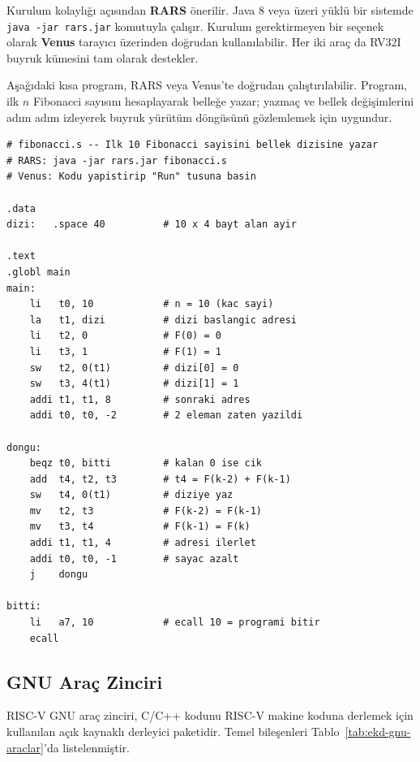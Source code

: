 \begin{bilginot}
Kurulum kolaylığı açısından \textbf{RARS} önerilir. Java 8 veya üzeri yüklü bir sistemde \texttt{java -jar rars.jar} komutuyla çalışır. Kurulum gerektirmeyen bir seçenek olarak \textbf{Venus} tarayıcı üzerinden doğrudan kullanılabilir. Her iki araç da RV32I buyruk kümesini tam olarak destekler.
\end{bilginot}

Aşağıdaki kısa program, RARS veya Venus'te doğrudan çalıştırılabilir. Program, ilk $n$ Fibonacci sayısını hesaplayarak belleğe yazar; yazmaç ve bellek değişimlerini adım adım izleyerek buyruk yürütüm döngüsünü gözlemlemek için uygundur.

\begin{lstlisting}[style=riscv, caption={Fibonacci sayıları (RARS/Venus ile çalıştırılabilir)}, label={lst:ekd-fibonacci}]
# fibonacci.s -- Ilk 10 Fibonacci sayisini bellek dizisine yazar
# RARS: java -jar rars.jar fibonacci.s
# Venus: Kodu yapistirip "Run" tusuna basin

.data
dizi:   .space 40          # 10 x 4 bayt alan ayir

.text
.globl main
main:
    li   t0, 10            # n = 10 (kac sayi)
    la   t1, dizi          # dizi baslangic adresi
    li   t2, 0             # F(0) = 0
    li   t3, 1             # F(1) = 1
    sw   t2, 0(t1)         # dizi[0] = 0
    sw   t3, 4(t1)         # dizi[1] = 1
    addi t1, t1, 8         # sonraki adres
    addi t0, t0, -2        # 2 eleman zaten yazildi

dongu:
    beqz t0, bitti         # kalan 0 ise cik
    add  t4, t2, t3        # t4 = F(k-2) + F(k-1)
    sw   t4, 0(t1)         # diziye yaz
    mv   t2, t3            # F(k-2) = F(k-1)
    mv   t3, t4            # F(k-1) = F(k)
    addi t1, t1, 4         # adresi ilerlet
    addi t0, t0, -1        # sayac azalt
    j    dongu

bitti:
    li   a7, 10            # ecall 10 = programi bitir
    ecall
\end{lstlisting}

\subsection{GNU Araç Zinciri}
\label{sec:ekd-gnu-arac}

RISC-V GNU araç zinciri, C/C++ kodunu RISC-V makine koduna derlemek için kullanılan açık kaynaklı derleyici paketidir. Temel bileşenleri Tablo~\ref{tab:ekd-gnu-araclar}'da listelenmiştir.

